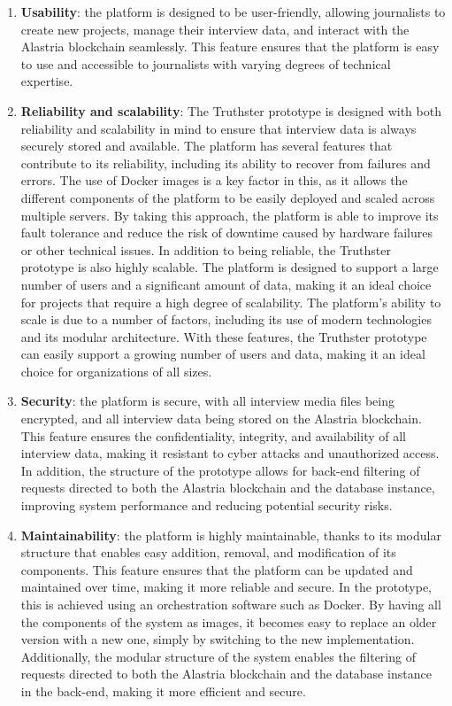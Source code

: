 \documentclass[target=mst,aauheader=]{thud}
\begin{document}
    \begin{enumerate}

        \item \textbf{Usability}: the platform is designed to be user-friendly, allowing journalists to create new projects, manage their interview data, and interact with the Alastria blockchain seamlessly. This feature ensures that the platform is easy to use and accessible to journalists with varying degrees of technical expertise.
        \item \textbf{Reliability and scalability}: The Truthster prototype is designed with both reliability and scalability in mind to ensure that interview data is always securely stored and available. The platform has several features that contribute to its reliability, including its ability to recover from failures and errors. The use of Docker images is a key factor in this, as it allows the different components of the platform to be easily deployed and scaled across multiple servers. By taking this approach, the platform is able to improve its fault tolerance and reduce the risk of downtime caused by hardware failures or other technical issues. In addition to being reliable, the Truthster prototype is also highly scalable. The platform is designed to support a large number of users and a significant amount of data, making it an ideal choice for projects that require a high degree of scalability. The platform's ability to scale is due to a number of factors, including its use of modern technologies and its modular architecture. With these features, the Truthster prototype can easily support a growing number of users and data, making it an ideal choice for organizations of all sizes.
        \item \textbf{Security}: the platform is secure, with all interview media files being encrypted, and all interview data being stored on the Alastria blockchain. This feature ensures the confidentiality, integrity, and availability of all interview data, making it resistant to cyber attacks and unauthorized access. In addition, the structure of the prototype allows for back-end filtering of requests directed to both the Alastria blockchain and the database instance, improving system performance and reducing potential security risks.
        \item \textbf{Maintainability}: the platform is highly maintainable, thanks to its modular structure that enables easy addition, removal, and modification of its components. This feature ensures that the platform can be updated and maintained over time, making it more reliable and secure. In the prototype, this is achieved using an orchestration software such as Docker. By having all the components of the system as images, it becomes easy to replace an older version with a new one, simply by switching to the new implementation. Additionally, the modular structure of the system enables the filtering of requests directed to both the Alastria blockchain and the database instance in the back-end, making it more efficient and secure.

\end{enumerate}
\end{document}

